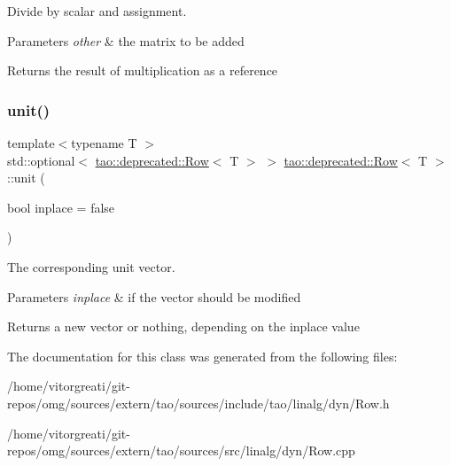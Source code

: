 Divide by scalar and assignment. 


\begin{DoxyParams}{Parameters}
{\em other} & the matrix to be added \\
\hline
\end{DoxyParams}
\begin{DoxyReturn}{Returns}
the result of multiplication as a reference 
\end{DoxyReturn}
\mbox{\label{classtao_1_1deprecated_1_1_row_a8e523db6cc0623ef5497995e90c41b7d}} 
\subsubsection{\texorpdfstring{unit()}{unit()}}
{\footnotesize\ttfamily template$<$typename T $>$ \\
std\+::optional$<$ \mbox{\hyperlink{classtao_1_1deprecated_1_1_row}{tao\+::deprecated\+::\+Row}}$<$ T $>$ $>$ \mbox{\hyperlink{classtao_1_1deprecated_1_1_row}{tao\+::deprecated\+::\+Row}}$<$ T $>$\+::unit (\begin{DoxyParamCaption}\item[{bool}]{inplace = {\ttfamily false} }\end{DoxyParamCaption})}



The corresponding unit vector. 


\begin{DoxyParams}{Parameters}
{\em inplace} & if the vector should be modified \\
\hline
\end{DoxyParams}
\begin{DoxyReturn}{Returns}
a new vector or nothing, depending on the inplace value 
\end{DoxyReturn}


The documentation for this class was generated from the following files\+:\begin{DoxyCompactItemize}
\item 
/home/vitorgreati/git-\/repos/omg/sources/extern/tao/sources/include/tao/linalg/dyn/Row.\+h\item 
/home/vitorgreati/git-\/repos/omg/sources/extern/tao/sources/src/linalg/dyn/Row.\+cpp\end{DoxyCompactItemize}
